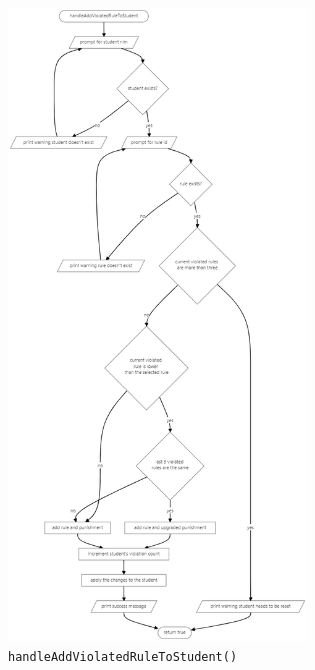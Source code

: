 \documentclass[12pt,titlepage]{article}
\begin{document}
\pagebreak

\begin{figure}[h]
    \centering
    \includegraphics[height=16.75cm]{flowcharts/handle-add-rule-to-student.png}
    \caption{\texttt{handleAddViolatedRuleToStudent()}}
\end{figure}

\pagebreak
\end{document}
